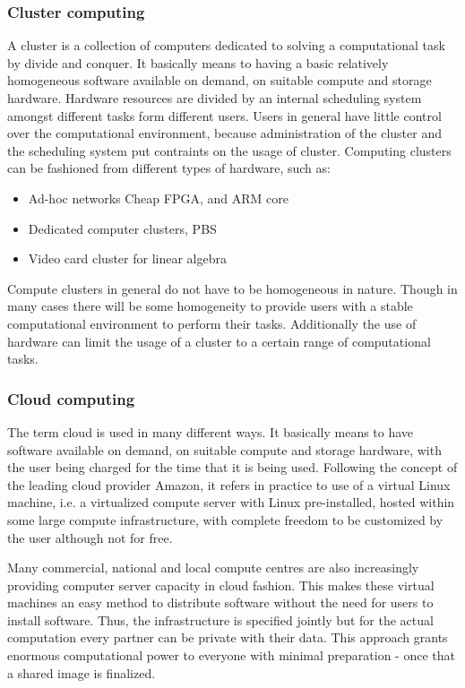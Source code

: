 \subsubsection*{Cluster computing}
A cluster is a collection of computers dedicated to solving a computational task by divide 
and conquer. It basically means to having a basic relatively homogeneous software available 
on demand, on suitable compute and storage hardware. Hardware resources are divided by an 
internal scheduling system amongst different tasks form different users. Users in general 
have little control over the computational environment, because administration of the cluster 
and the scheduling system put contraints on the usage of cluster. Computing clusters can be 
fashioned from different types of hardware, such as:
\begin{itemize}
  \item Ad-hoc networks Cheap FPGA, and ARM core
  \item Dedicated computer clusters, PBS
  \item Video card cluster for linear algebra
\end{itemize}
Compute clusters in general do not have to be homogeneous in nature. Though in many cases 
there will be some homogeneity to provide users with a stable computational environment to 
perform their tasks. Additionally the use of hardware can limit the usage of a cluster to a 
certain range of computational tasks.

\subsubsection*{Cloud computing}
The term cloud is used in many different ways. It basically means to have software available 
on demand, on suitable compute and storage hardware, with the user being charged for the time 
that it is being used. Following the concept of the leading cloud provider Amazon, it refers 
in practice to use of a virtual Linux machine, i.e. a virtualized compute server with Linux 
pre-installed, hosted within some large compute infrastructure, with complete freedom to be 
customized by the user although not for free\cite{Trelles:2011}.

Many commercial, national and local compute centres are also increasingly providing computer
server capacity in cloud fashion. This makes these virtual machines an easy method to distribute 
software without the need for users to install software. Thus, the infrastructure is specified
jointly but for the actual computation every partner can be private with their data. This 
approach grants enormous computational power to everyone with minimal preparation - once that 
a shared image is finalized.

